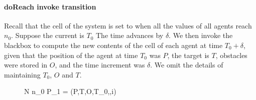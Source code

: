 \paragraph{doReach invoke transition} Recall that the  cell of the system is set to  when all the  values of all agents reach $n_0$. Suppose the current  is $T_0$ The time advances by $\delta$. We then invoke the blackbox  to compute the new contents of the  cell of each agent at time $T_0 +\delta$, given that the position of the agent at time $T_0$ was $P$, the target  is $T$, obstacles were stored in $O$, and the time increment was $\delta$. We omit the details of maintaining $T_0$, $O$ and $T$.
\begin{figure}
\label{fig:lock1}
{N  n_0  P_{1} = (P,T,O,T_0,\delta,i)}{}{}{}
\end{figure}

